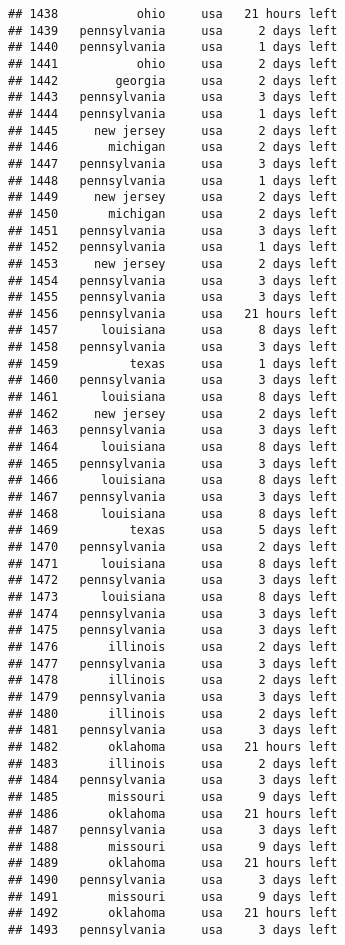 \documentclass[
]{article}
\begin{document}
\begin{verbatim}
## 1438           ohio     usa   21 hours left
## 1439   pennsylvania     usa     2 days left
## 1440   pennsylvania     usa     1 days left
## 1441           ohio     usa     2 days left
## 1442        georgia     usa     2 days left
## 1443   pennsylvania     usa     3 days left
## 1444   pennsylvania     usa     1 days left
## 1445     new jersey     usa     2 days left
## 1446       michigan     usa     2 days left
## 1447   pennsylvania     usa     3 days left
## 1448   pennsylvania     usa     1 days left
## 1449     new jersey     usa     2 days left
## 1450       michigan     usa     2 days left
## 1451   pennsylvania     usa     3 days left
## 1452   pennsylvania     usa     1 days left
## 1453     new jersey     usa     2 days left
## 1454   pennsylvania     usa     3 days left
## 1455   pennsylvania     usa     3 days left
## 1456   pennsylvania     usa   21 hours left
## 1457      louisiana     usa     8 days left
## 1458   pennsylvania     usa     3 days left
## 1459          texas     usa     1 days left
## 1460   pennsylvania     usa     3 days left
## 1461      louisiana     usa     8 days left
## 1462     new jersey     usa     2 days left
## 1463   pennsylvania     usa     3 days left
## 1464      louisiana     usa     8 days left
## 1465   pennsylvania     usa     3 days left
## 1466      louisiana     usa     8 days left
## 1467   pennsylvania     usa     3 days left
## 1468      louisiana     usa     8 days left
## 1469          texas     usa     5 days left
## 1470   pennsylvania     usa     2 days left
## 1471      louisiana     usa     8 days left
## 1472   pennsylvania     usa     3 days left
## 1473      louisiana     usa     8 days left
## 1474   pennsylvania     usa     3 days left
## 1475   pennsylvania     usa     3 days left
## 1476       illinois     usa     2 days left
## 1477   pennsylvania     usa     3 days left
## 1478       illinois     usa     2 days left
## 1479   pennsylvania     usa     3 days left
## 1480       illinois     usa     2 days left
## 1481   pennsylvania     usa     3 days left
## 1482       oklahoma     usa   21 hours left
## 1483       illinois     usa     2 days left
## 1484   pennsylvania     usa     3 days left
## 1485       missouri     usa     9 days left
## 1486       oklahoma     usa   21 hours left
## 1487   pennsylvania     usa     3 days left
## 1488       missouri     usa     9 days left
## 1489       oklahoma     usa   21 hours left
## 1490   pennsylvania     usa     3 days left
## 1491       missouri     usa     9 days left
## 1492       oklahoma     usa   21 hours left
## 1493   pennsylvania     usa     3 days left

\end{verbatim}
\end{document}
